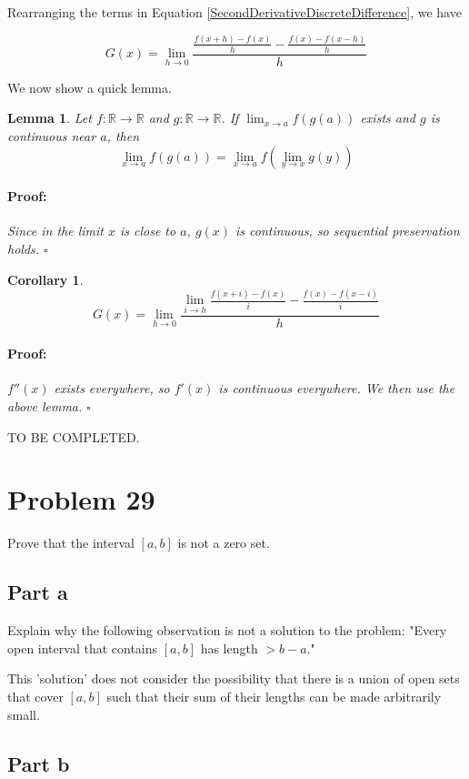\documentclass{article}
\newenvironment{proof}{\paragraph{Proof:}}{\hfill$\square$}
\newtheorem{lemma}[theorem]{Lemma}
\newtheorem{corollary}[theorem]{Corollary}
\newcommand{\R}{\mathbb{R}}
\begin{document}
Rearranging the terms in Equation \ref{SecondDerivativeDiscreteDifference}, we have

\begin{equation}
\label{GNestedDerivatives}
G(x) = \lim_{h \rightarrow 0} 
\frac{
\frac{f(x+h) - f(x)}{h}
-
\frac{f(x) - f(x-h)}{h}
}
{h}
\end{equation}

We now show a quick lemma.

\begin{lemma}
Let $f: \R \rightarrow \R$ and $g: \R \rightarrow \R$. If $\lim_{x \rightarrow a} f(g(a))$ exists and $g$ is continuous near $a$, then
\[
\lim_{x \rightarrow a} f(g(a)) = \lim_{x \rightarrow a} f( \lim_{y \rightarrow x} g(y))
\]
\begin{proof}
Since in the limit $x$ is close to $a$, $g(x)$ is continuous, so sequential preservation holds.
\end{proof}
\end{lemma}

\begin{corollary}
\[
G(x) = \lim_{h \rightarrow 0} 
\frac{
\lim_{i \rightarrow h} \frac{f(x+i) - f(x)}{i}
-
\frac{f(x) - f(x-i)}{i}
}
{h}
\]
\begin{proof}
$f''(x)$ exists everywhere, so $f'(x)$ is continuous everywhere. We then use the above lemma.
\end{proof}
\end{corollary}

TO BE COMPLETED.

\section*{Problem 29}

Prove that the interval $[a, b]$ is not a zero set.

\subsection*{Part a}

Explain why the following observation is not a solution to the problem: "Every open interval that contains $[a, b]$ has length $> b-a$."

This 'solution' does not consider the possibility that there is a union of open sets that cover $[a, b]$ such that their sum of their lengths can be made arbitrarily small.

\subsection*{Part b}
\end{document}
